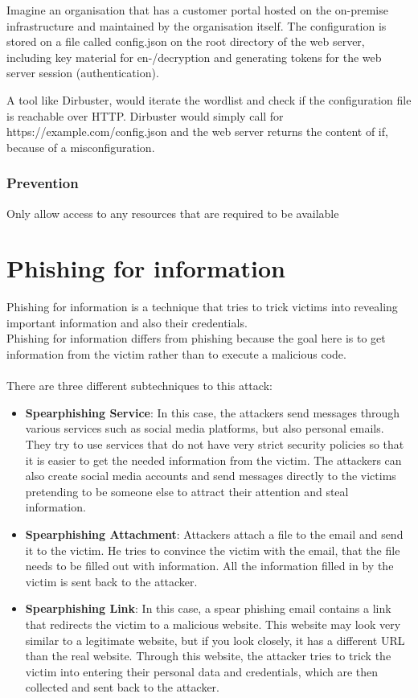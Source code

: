 Imagine an organisation that has a customer portal hosted on the on-premise infrastructure and maintained by the organisation itself.
The configuration is stored on a file called config.json on the root directory of the web server, including key material for en-/decryption and generating tokens for the web server session (authentication).

A tool like Dirbuster, would iterate the wordlist and check if the configuration file is reachable over HTTP. 
Dirbuster would simply call for https://example.com/config.json and the web server returns the content of if, because of a misconfiguration.
\subsubsection{Prevention}
Only allow access to any resources that are required to be available

\newpage
\section{Phishing for information}
Phishing for information is a technique that tries to trick victims into revealing important information and also their credentials. \\
Phishing for information differs from phishing because the goal here is to get information from the victim rather than to execute a malicious code. \\
\\There are three different subtechniques to this attack:
\begin{itemize}
    \item \textbf{Spearphishing Service}: 
    In this case, the attackers send messages through various services such as social media platforms, but also personal emails. 
    They try to use services that do not have very strict security policies so that it is easier to get the needed information from the victim. 
    The attackers can also create social media accounts and send messages directly to the victims pretending to be someone else to attract their attention and steal information.  
    \item \textbf{Spearphishing Attachment}: Attackers attach a file to the email and send it to the victim. 
    He tries to convince the victim with the email, that the file needs to be filled out with information.
    All the information filled in by the victim is sent back to the attacker.
    \item \textbf{Spearphishing Link}: In this case, a spear phishing email contains a link that redirects the victim to a malicious website. This website may look very similar to a legitimate website, but if you look closely, it has a different URL than the real website. 
    Through this website, the attacker tries to trick the victim into entering their personal data and credentials, which are then collected and sent back to the attacker.
\end{itemize}

